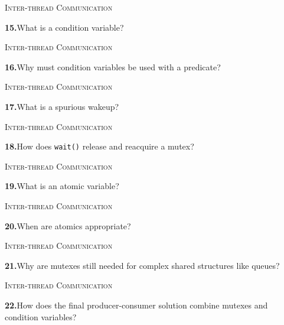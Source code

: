\documentclass[11pt,a4paper]{article}
\newenvironment{questionblock}{%
  \begin{minipage}[t][0.455\textheight][t]{\textwidth}%
  \raggedright\small
}{%
  \vfill
  \end{minipage}%
}
\newcommand{\sectionlabel}[1]{\textsc{#1}\par\vspace{0.35em}}
\newcommand{\questionnumber}[1]{\textbf{#1.}\enspace}
\begin{document}
\newpage
\begin{questionblock}
\sectionlabel{Inter-thread Communication}
\questionnumber{15}What is a condition variable?\par
\end{questionblock}
\vspace*{0.04\textheight}
\begin{questionblock}
\sectionlabel{Inter-thread Communication}
\questionnumber{16}Why must condition variables be used with a predicate?\par
\end{questionblock}
\newpage
\begin{questionblock}
\sectionlabel{Inter-thread Communication}
\questionnumber{17}What is a spurious wakeup?\par
\end{questionblock}
\vspace*{0.04\textheight}
\begin{questionblock}
\sectionlabel{Inter-thread Communication}
\questionnumber{18}How does \verb|wait()| release and reacquire a mutex?\par
\end{questionblock}
\newpage
\begin{questionblock}
\sectionlabel{Inter-thread Communication}
\questionnumber{19}What is an atomic variable?\par
\end{questionblock}
\vspace*{0.04\textheight}
\begin{questionblock}
\sectionlabel{Inter-thread Communication}
\questionnumber{20}When are atomics appropriate?\par
\end{questionblock}
\newpage
\begin{questionblock}
\sectionlabel{Inter-thread Communication}
\questionnumber{21}Why are mutexes still needed for complex shared structures like queues?\par
\end{questionblock}
\vspace*{0.04\textheight}
\begin{questionblock}
\sectionlabel{Inter-thread Communication}
\questionnumber{22}How does the final producer-consumer solution combine mutexes and condition variables?\par
\end{questionblock}
\end{document}
